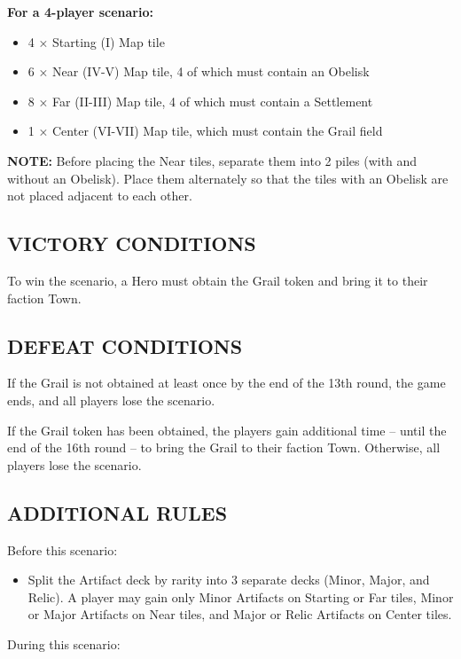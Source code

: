 \begin{multicols*}{2}
\textbf{For a 4-player scenario:}
\begin{itemize}
  \item 4 × Starting (I) Map tile
  \item 6 × Near (IV-V) Map tile, 4 of which must contain an Obelisk
  \item 8 × Far (II-III) Map tile, 4 of which must contain a Settlement
  \item 1 × Center (VI-VII) Map tile, which must contain the Grail field
\end{itemize}

\textbf{\MakeUppercase{Note:}} Before placing the Near tiles, separate them into 2 piles (with and without an Obelisk). Place them alternately so that the tiles with an Obelisk are not placed adjacent to each other.

\subsection*{\MakeUppercase{Victory Conditions}}
To win the scenario, a Hero must obtain the Grail token and bring it to their faction Town.

\subsection*{\MakeUppercase{Defeat Conditions}}
If the Grail is not obtained at least once by the end of the 13th round, the game ends, and all players lose the scenario.

If the Grail token has been obtained, the players gain additional time – until the end of the 16th round – to bring the Grail to their faction Town. Otherwise, all players lose the scenario.

\subsection*{\MakeUppercase{Additional Rules}}
Before this scenario:

\begin{itemize}
  \item Split the Artifact deck by rarity into 3 separate decks (Minor, Major, and Relic). A player may gain only Minor Artifacts on Starting or Far tiles, Minor or Major Artifacts on Near tiles, and Major or Relic Artifacts on Center tiles.
\end{itemize}

During this scenario:


\end{multicols*}
